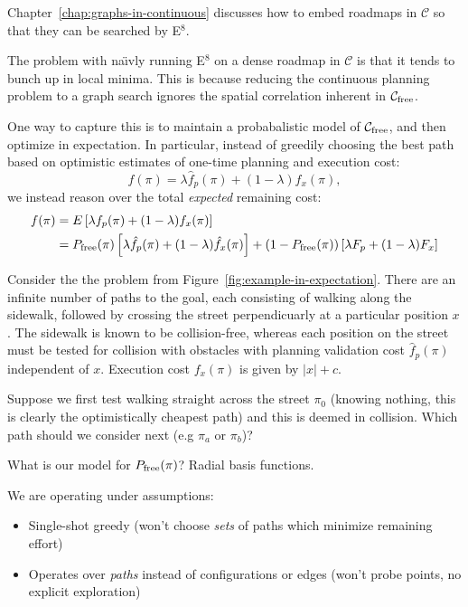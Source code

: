 {Chapter~\ref{chap:graphs-in-continuous}
discusses how to embed roadmaps in $\mathcal{C}$
so that they can be searched by E$^8$.

The problem with na\"{\i}vly running E$^8$ on a
dense roadmap in $\mathcal{C}$
is that it tends to bunch up in local minima.
This is because reducing the continuous planning problem
to a graph search ignores the spatial correlation
inherent in $\mathcal{C}_{\mbox{\scriptsize free}}$.

One way to capture this is to maintain a probabalistic model
of $\mathcal{C}_{\mbox{\scriptsize free}}$,
and then optimize in expectation.
In particular,
instead of greedily choosing the best path based on
optimistic estimates of one-time planning and execution cost:
\begin{equation}
   f(\pi) = \lambda \hat{f}_p(\pi) + (1-\lambda) \hat{f}_x(\pi),
\end{equation}
we instead reason over the total \emph{expected} remaining cost:
\begin{align}
   f(\pi)
      &= E \left[ \lambda f_p(\pi) + (1-\lambda) f_x(\pi) \right] \\
   &= P_{\mbox{\scriptsize free}}(\pi)
      \left[ \lambda \hat{f}_p(\pi) + (1-\lambda) \hat{f}_x(\pi) \right]
      + (1-P_{\mbox{\scriptsize free}}(\pi))
      \left[ \lambda F_p + (1-\lambda) F_x \right]
\end{align}

Consider the the problem from Figure~\ref{fig:example-in-expectation}.
There are an infinite number of paths to the goal,
each consisting of walking along the sidewalk,
followed by crossing the street perpendicuarly at a particular
position $x$.
The sidewalk is known to be collision-free,
whereas each position on the street must be tested for collision
with obstacles with planning validation cost $\hat{f}_p(\pi)$
independent of $x$.
Execution cost $f_x(\pi)$ is given by $|x|+c$.

Suppose we first test walking straight across the street $\pi_0$
(knowing nothing, this is clearly the optimistically cheapest path)
and this is deemed in collision.
Which path should we consider next (e.g $\pi_a$ or $\pi_b$)?

What is our model for $P_{\mbox{\scriptsize free}}(\pi)$?
Radial basis functions.

We are operating under assumptions:
\begin{itemize}
\item Single-shot greedy (won't choose \emph{sets} of paths
   which minimize remaining effort)
\item Operates over \emph{paths} instead of configurations
   or edges (won't probe points, no explicit exploration)
\end{itemize}

}
